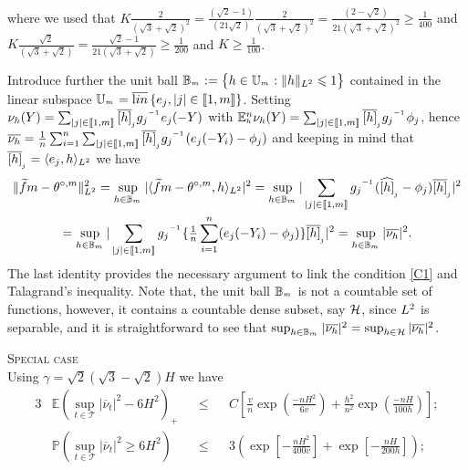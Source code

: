 {\begin{rmk}
\begin{align}
\end{align}
where we used that
$K\tfrac{2}{(\sqrt{3}+\sqrt{2})^2}=\tfrac{(\sqrt{2}-1)}{(21\sqrt{2})}\tfrac{2}{(\sqrt{3}+\sqrt{2})^2}=\tfrac{(2-\sqrt{2})}{21(\sqrt{3}+\sqrt{2})^2}\geq\tfrac{1}{400}$
and
$K\tfrac{\sqrt{2}}{(\sqrt{3}+\sqrt{2})}=\tfrac{\sqrt{2}-1}{21(\sqrt{3}+\sqrt{2})}\geq\tfrac{1}{200}$
and $K\geq \tfrac{1}{100}$.\remEnd
\end{rmk}
\begin{rmk}\label{rem:re:tal} Introduce further the unit ball $\mBaH:=\set{\He\in\mHiH:\VnormLp{\He}\leq1}$
 contained in the linear subspace
 $\mHiH=\lin\set{\bas_{j},|j|\in\nset{1,\Di}}$. Setting
 $\nu_{\He}(\rY)=\sum_{|j|\in\nset{1,\Di}}\ofHe{j}\fedfI[j]\bas_j(-\rY)$
 with
 $\FuEx[\ssY]{\ydf}\nu_{\He}(\rY)=\sum_{|j|\in\nset{1,\Di}}\ofHe{j}\fedfI[j]\fydf[j]$,
 hence $\overline{\nu_{\He}}=\tfrac{1}{\ssY}\sum_{i=1}^{\ssY}\sum_{|j|\in\nset{1,\Di}}\ofHe{j}\fedfI[j](\bas_j(-\rY_i)-\fydf[j])$ and
 keeping in mind that $\ofHe{j}=\VskalarLp{\bas_j,\He}$ we have
\begin{multline*}
	\VnormLp{\txdfPr-\xdfPr}^2=\sup_{\He\in\mBaH}|\VskalarLp{\txdfPr-\xdfPr,\He}|^2=\sup_{\He\in\mBaH}|\sum_{|j|\in\nset{1,\Di}}\fedfI[j](\hfydf[j]-\fydf[j])\ofHe{j}|^2\\
=\sup_{\He\in\mBaH}|\sum_{|j|\in\nset{1,\Di}}\fedfI[j]\{\tfrac{1}{\ssY}\sum_{i=1}^{\ssY}(\bas_j(-\rY_i)-\fydf[j])\}\ofHe{j}|^2
=\sup_{\He\in\mBaH}|\overline{\nu_{\He}}|^2.
\end{multline*}
The last identity provides the necessary argument to link the
condition  \ref{C1} and Talagrand's inequality.  Note that, the unit ball $\mBaH$ is not a countable set of functions, however, it contains a countable dense subset, say $\cH$, since $\Lp^2$ is separable, and it is straightforward to see that $\sup_{\He\in\mBaH}|\overline{\nu_{\He}}|^2=\sup_{\He\in\cH}|\overline{\nu_{\He}}|^2$.
\remEnd
\end{rmk}
}

\begin{rmk}{\textsc{Special case} \\}\label{rmkA.2.1}
Using $\gamma = \sqrt{2}\left( \sqrt{3} - \sqrt{2}\right) H$ we have 
\begin{alignat*}{3}
& \mathds{E}\left(\sup\limits_{t \in \mathcal{T}}\vert \overline{\nu}_{t} \vert^{2} - 6 H^{2}\right)_{+} && \leq && C \left[\frac{v}{n} \exp\left(\frac{-n H^{2}}{6 v}\right) + \frac{h^{2}}{n^{2}} \exp\left(\frac{- n H}{100 h}\right)\right];\\
& \mathds{P}\left(\sup\limits_{t \in \mathcal{T}} \vert \overline{\nu}_{t} \vert^{2} \geq 6 H^{2}\right) && \leq && 3 \left(\exp\left[- \frac{n H^{2}}{400 v} \right] + \exp\left[- \frac{n H}{200 h} \right]\right);
\end{alignat*}
\end{rmk}

